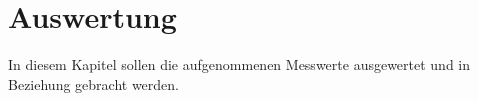 \section{Auswertung}
\label{sec:auswertung}
In diesem Kapitel sollen die aufgenommenen Messwerte ausgewertet und in Beziehung gebracht werden.

\subsection{}
\label{sec:}